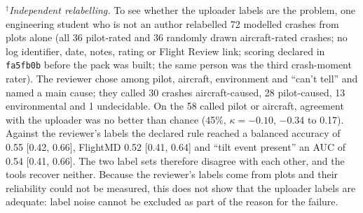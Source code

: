 \documentclass[preprint,12pt]{elsarticle}
\begin{document}
$^\dagger$\emph{Independent relabelling.} To see whether the uploader labels are the problem, one engineering student who is not an author relabelled 72 modelled crashes from plots alone (all 36 pilot-rated and 36 randomly drawn aircraft-rated crashes; no log identifier, date, notes, rating or Flight Review link; scoring declared in \texttt{fa5fb0b} before the pack was built; the same person was the third crash-moment rater). The reviewer chose among pilot, aircraft, environment and ``can't tell'' and named a main cause; they called 30 crashes aircraft-caused, 28 pilot-caused, 13 environmental and 1 undecidable. On the 58 called pilot or aircraft, agreement with the uploader was no better than chance (45\%, $\kappa=-0.10$, $-0.34$ to 0.17). Against the reviewer's labels the declared rule reached a balanced accuracy of 0.55 [0.42, 0.66], FlightMD 0.52 [0.41, 0.64] and ``tilt event present'' an AUC of 0.54 [0.41, 0.66]. The two label sets therefore disagree with each other, and the tools recover neither. Because the reviewer's labels come from plots and their reliability could not be measured, this does not show that the uploader labels are adequate: label noise cannot be excluded as part of the reason for the failure.
\end{document}
